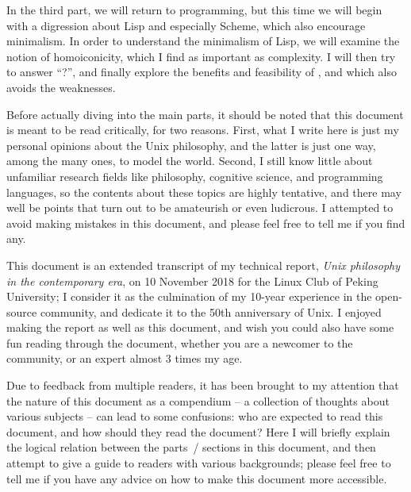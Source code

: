 \documentclass{article}
\begin{document}
In the third part, we will return to programming, but this time we will begin
with a digression about Lisp and especially Scheme, which also encourage
minimalism.  In order to understand the minimalism of Lisp, we will examine
the notion of homoiconicity, which I find as important as complexity.  I will
then try to answer ``?'', and finally explore the benefits and feasibility of
, and which also avoids the weaknesses.

Before actually diving into the main parts, it should be noted that this
document is meant to be read critically, for two reasons.  First, what I write
here is just my personal opinions about the Unix philosophy, and the latter
is just one way, among the many ones, to model the world.  Second, I still
know little about unfamiliar research fields like philosophy, cognitive
science, and programming languages, so the contents about these topics are
highly tentative, and there may well be points that turn out to be amateurish
or even ludicrous.  I attempted to avoid making mistakes in this document,
and please feel free to tell me if you find any.

This document is an extended transcript of my technical report,
\emph{Unix philosophy in the contemporary era}, on
10 November 2018 for the Linux Club of Peking University; I consider it
as the culmination of my 10-year experience in the open-source community,
and dedicate it to the 50th anniversary of Unix.
I enjoyed making the report as well as this document, and wish you
could also have some fun reading through the document, whether you
are a newcomer to the community, or an expert almost 3 times my age.

\newpage
{}

Due to feedback from multiple readers, it has been brought to my attention that
the nature of this document as a compendium -- a collection of thoughts about
various subjects -- can lead to some confusions: who are expected to read this
document, and how should they read the document?  Here I will briefly explain
the logical relation between the parts~/ sections in this document, and then
attempt to give a guide to readers with various backgrounds; please feel free
to tell me if you have any advice on how to make this document more accessible.
\end{document}
